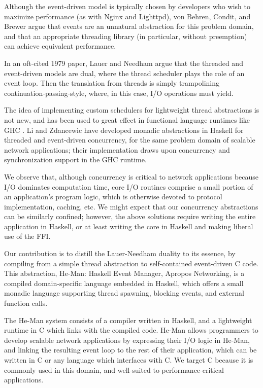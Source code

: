 \documentclass[preprint]{sigplanconf}
\begin{document}
Although the event-driven model is typically chosen by developers who wish to
maximize performance (as with Nginx and Lighttpd), von Behren, Condit, and
Brewer \cite{vonBehrenConditBrewer} argue that events are an unnatural
abstraction for this problem domain, and that an appropriate threading library
(in particular, without preemption) can achieve equivalent performance.

In an oft-cited 1979 paper, Lauer and Needham \cite{LauerNeedham} argue that the
threaded and event-driven models are dual, where the thread scheduler plays the
role of an event loop. Then the translation from threads is simply trampolining
continuation-passing-style, where, in this case, I/O operations must yield.

The idea of implementing custom schedulers for lightweight thread abstractions
is not new, and has been used to great effect in functional language runtimes
like GHC \cite{MarlowEtAl}. Li and Zdancewic \cite{LiZdancewic} have developed
monadic abstractions in Haskell for threaded and event-driven concurrency, for
the same problem domain of scalable network applications; their implementation
draws upon concurrency and synchronization support in the GHC runtime.

We observe that, although concurrency is critical to network applications
because I/O dominates computation time, core I/O routines comprise a small
portion of an application's program logic, which is otherwise devoted to
protocol implementation, caching, etc. We might expect that our concurrency
abstractions can be similarly confined; however, the above solutions require
writing the entire application in Haskell, or at least writing the core in
Haskell and making liberal use of the FFI.

Our contribution is to distill the Lauer-Needham duality to its essence, by
compiling from a simple thread abstraction to self-contained event-driven C
code. This abstraction, He-Man: Haskell Event Manager, Apropos Networking, is a
compiled domain-specific language embedded in Haskell, which offers a small
monadic language supporting thread spawning, blocking events, and external
function calls.

The He-Man system consists of a compiler written in Haskell, and a lightweight
runtime in C which links with the compiled code. He-Man allows programmers to
develop scalable network applications by expressing their I/O logic in He-Man,
and linking the resulting event loop to the rest of their application, which can
be written in C or any language which interfaces with C. We target C because it
is commonly used in this domain, and well-suited to performance-critical
applications.
\end{document}
